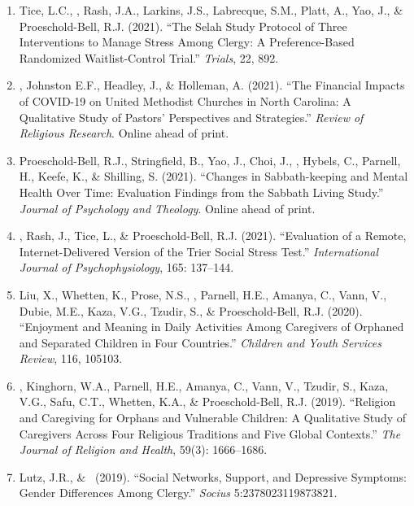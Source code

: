 \begin{enumerate}
\item Tice, L.C., \Eagle, Rash, J.A., Larkins, J.S., Labrecque, S.M., Platt, A., Yao, J., \& Proeschold-Bell, R.J. (2021). ``The Selah Study Protocol of Three Interventions to Manage Stress Among Clergy: A Preference-Based Randomized Waitlist-Control Trial.''  \emph{Trials}, 22, 892. 

\item \Eagle, Johnston E.F., Headley, J., \& Holleman, A. (2021). ``The Financial Impacts of COVID-19 on United Methodist Churches in North Carolina: A Qualitative Study of Pastors’ Perspectives and Strategies.'' \emph{Review of Religious Research}. Online ahead of print. 

\item Proeschold-Bell, R.J., Stringfield, B., Yao, J., Choi, J., \Eagle, Hybels, C., Parnell, H., Keefe, K., \& Shilling, S. (2021). ``Changes in Sabbath-keeping and Mental Health Over Time: Evaluation Findings from the Sabbath Living Study.'' \emph{Journal of Psychology and Theology}. Online ahead of print. 

\item \Eagle, Rash, J., Tice, L., \& Proeschold-Bell, R.J. (2021). ``Evaluation of a Remote, Internet-Delivered Version of the Trier Social Stress Test.'' \emph{International Journal of Psychophysiology}, 165: 137--144. 

\item Liu, X., Whetten, K., Prose, N.S., \Eagle, Parnell, H.E., Amanya, C., Vann, V., Dubie, M.E., Kaza, V.G., Tzudir, S., \& Proeschold-Bell, R.J. (2020). ``Enjoyment and Meaning in Daily Activities Among Caregivers of Orphaned and Separated Children in Four Countries.'' \emph{Children and Youth Services Review}, 116, 105103. 

\item \Eagle, Kinghorn, W.A., Parnell, H.E., Amanya, C., Vann, V., Tzudir, S., Kaza, V.G., Safu, C.T., Whetten, K.A., \& Proeschold-Bell, R.J. (2019). ``Religion and Caregiving for Orphans and Vulnerable Children: A Qualitative Study of Caregivers Across Four Religious Traditions and Five Global Contexts.'' \emph{The Journal of Religion and Health}, 59(3): 1666--1686. 

\item Lutz, J.R., \& \Eagle\CS\ (2019). ``Social Networks, Support, and Depressive Symptoms: Gender Differences Among Clergy.'' \emph{Socius} 5:2378023119873821. 


\end{enumerate}
